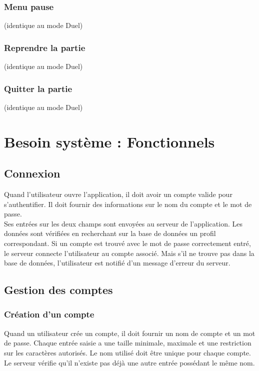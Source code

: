 \documentclass{article}
\begin{document}
\subsubsection*{Menu pause} (identique au mode Duel)
\subsubsection*{Reprendre la partie} (identique au mode Duel)
\subsubsection*{Quitter la partie} (identique au mode Duel)

\newpage

\section{Besoin système : Fonctionnels}

\subsection{Connexion}

\quad Quand l'utilisateur ouvre l'application, il doit avoir un compte valide pour s'authentifier. Il doit fournir des informations sur le nom du compte et le mot de passe.\\
Ses entrées sur les deux champs sont envoyées au serveur de l'application. Les données sont vérifiées en recherchant sur la base de données un profil correspondant. Si un compte est trouvé avec le mot de passe correctement entré, le serveur connecte l'utilisateur au compte associé. Mais s'il ne trouve pas dans la base de données, l'utilisateur est notifié d'un message d'erreur du serveur.

\subsection{Gestion des comptes}

\subsubsection{Création d'un compte}

Quand un utilisateur crée un compte, il doit fournir un nom de compte et un mot de passe. Chaque entrée saisie a une taille minimale, maximale et une restriction sur les caractères autorisés. Le nom utilisé doit être unique pour chaque compte.\\
Le serveur vérifie qu'il n'existe pas déjà une autre entrée possédant le même nom. 
\end{document}
